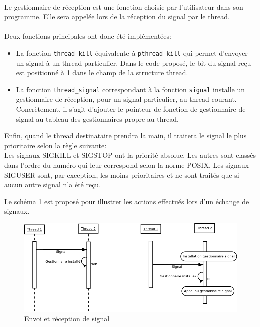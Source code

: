 \paragraph{}
Le gestionnaire de réception est une fonction choisie par l'utilisateur dans son programme. Elle sera appelée lors de la réception du signal par le thread. 

\paragraph{}
Deux fonctions principales ont donc été implémentées:
\begin{itemize}
\item La fonction \texttt{thread\_kill} équivalente à \texttt{pthread\_kill} qui permet d'envoyer un signal à un thread particulier. 
Dans le code proposé, le bit du signal reçu est positionné à 1 dans le champ de la structure thread.
\item La fonction \texttt{thread\_signal} correspondant à la fonction \texttt{signal} installe un gestionnaire de réception, pour un signal particulier, au thread courant.
Concrètement, il s'agit d'ajouter le pointeur de fonction de gestionnaire de signal au tableau des gestionnaires propre au thread.
\end{itemize}
Enfin, quand le thread destinataire prendra la main, il traitera le signal le plus prioritaire selon la règle suivante:\\
Les signaux SIGKILL et SIGSTOP ont la priorité absolue. Les autres sont classés dans l'ordre du numéro qui leur correspond selon la norme POSIX. Les signaux SIGUSER sont, par exception, les moins prioritaires et ne sont traités que si aucun autre signal n'a été reçu.

Le schéma \ref{signal} est proposé pour illustrer les actions effectués lors d'un échange de signaux.
\begin{figure}[!h]
  \caption{Envoi et réception de signal} %
  \label{signal} 
  \includegraphics[scale=0.4]{signal.png}
\end{figure}


